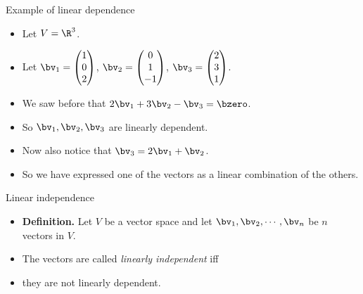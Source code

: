 \documentclass[handout]{beamer}
\begin{document}
\begin{frame}{Example of linear dependence}

\begin{itemize}
\item Let $V = \R^3$.
\item Let $\bv_1 =
\begin{pmatrix}
1 \\ 0 \\ 2
\end{pmatrix}
$,
$\bv_2 =
\begin{pmatrix}
0 \\ 1 \\ -1
\end{pmatrix}
$,
$\bv_3 =
\begin{pmatrix}
2 \\ 3 \\ 1
\end{pmatrix}
$.

\item We saw before that $2\bv_1+3\bv_2 - \bv_3 = \bzero$.
\item So $\bv_1, \bv_2, \bv_3$ are linearly dependent.
\item Now also notice that $\bv_3 = 2\bv_1 + \bv_2$.
\item So we have expressed one of the vectors as a linear combination of the others.
\end{itemize}

\end{frame}


\begin{frame}{Linear independence}

\begin{itemize}
\item \textbf{Definition.} Let $V$ be a vector space and let $\bv_1,\bv_2,\cdots,\bv_n$ be $n$ vectors in $V$.
\item The vectors are called \emph{linearly independent} iff
\item they are not linearly dependent.
\end{itemize}

\end{frame}
\end{document}
